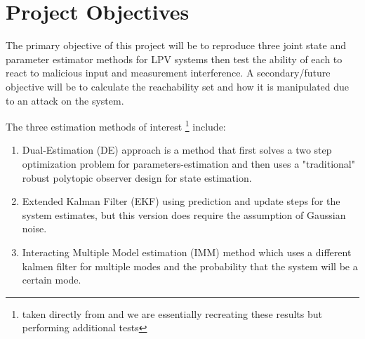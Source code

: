 \documentclass[]{article}
\begin{document}
\newpage
\section{Project Objectives}
The primary objective of this project will be to reproduce three joint state and parameter estimator methods for LPV systems then test the ability of each to react to malicious input and measurement interference. A secondary/future objective will be to calculate the reachability set and how it is manipulated due to an attack on the system.

The three estimation methods of interest \footnote{taken directly from \cite{beelen2017joint} and we are essentially recreating these results but performing additional tests} include:
\begin{enumerate}
	\item Dual-Estimation (DE) approach is a method that first solves a two step optimization problem for parameters-estimation and then uses a "traditional" robust polytopic observer design for state estimation. \cite{beelen2017joint}
	\item Extended Kalman Filter (EKF) using prediction and update steps for the system estimates, but this version does require the assumption of Gaussian noise. \cite{beelen2017joint}
	\item Interacting Multiple Model estimation (IMM) method which uses a different kalmen filter for multiple modes and the probability that the system will be a certain mode.\cite{bar2004estimation}
\end{enumerate}

\end{document}
